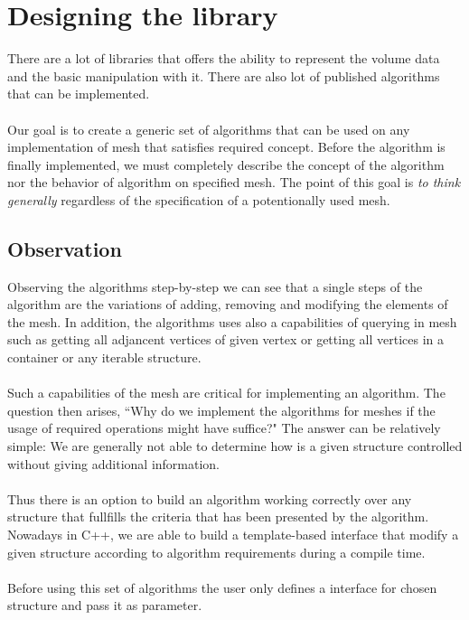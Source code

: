 \chapter{Designing the library}

There are a lot of libraries that offers the ability to represent the volume data
and the basic manipulation with it. There are also lot of published algorithms
that can be implemented.\\
\\
Our goal is to create a generic set of algorithms that can be used on any implementation
of mesh that satisfies required concept. Before the algorithm is finally implemented,
we must completely describe the concept of the algorithm nor the behavior of algorithm
on specified mesh. The point of this goal is \emph{to think generally} regardless of
the specification of a potentionally used mesh.\\

\section{Observation}

Observing the algorithms step-by-step we can see that a single steps
of the algorithm are the variations of adding, removing and modifying the elements
of the mesh. In addition, the algorithms uses also a capabilities of querying
in mesh such as getting all adjancent vertices of given vertex or getting all
vertices in a container or any iterable structure.\\
\\
Such a capabilities of the mesh are critical for implementing an algorithm.
The question then arises, ``Why do we implement the algorithms for meshes if
the usage of required operations might have suffice?" The answer can be relatively simple:
We are generally not able to determine how is a given structure controlled
without giving additional information.\\
\\
Thus there is an option to build an algorithm working correctly over any structure
that fullfills the criteria that has been presented by the algorithm. Nowadays in C++,
we are able to build a template-based interface that modify a given structure according
to algorithm requirements during a compile time.\\
\\
Before using this set of algorithms the user only defines a interface for chosen structure
and pass it as parameter.

